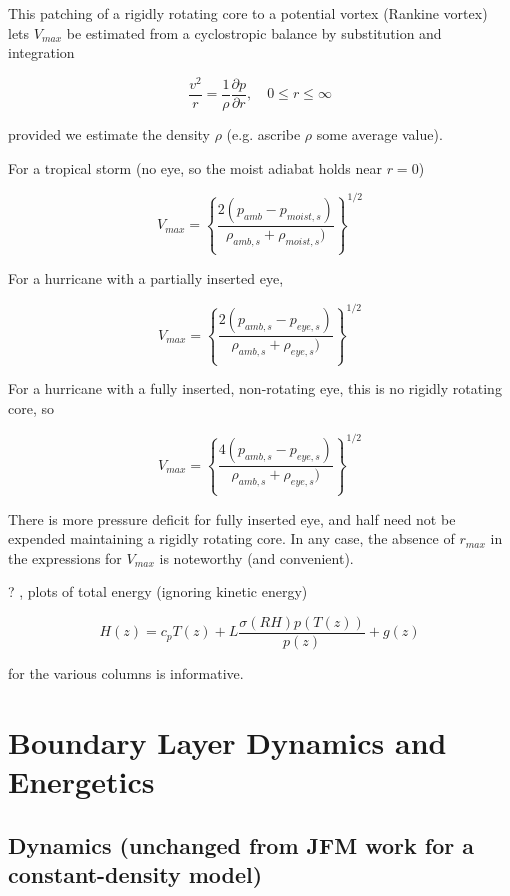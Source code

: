 \documentclass[preprint, prX]{revtex4}
\newcommand{\cbfrac}[2]{\left\{\frac{#1}{#2}\right\}}
\newcommand{\pd}[2]{\frac{\partial#1}{\partial#2}}
\begin{document}
This patching of a rigidly rotating core to a potential vortex (Rankine vortex) lets $V_{max}$ be estimated from a cyclostropic balance by substitution and integration

\begin{equation}
	\frac{v^2}{r} = \frac{1}{\rho} \pd{p}{r}, \quad 0 \le r \le \infty
\end{equation}

provided we estimate the density $\rho$ (e.g. ascribe $\rho$ some average value).

For a tropical storm (no eye, so the moist adiabat holds near $r=0$)

\begin{equation}
	V_{max} = \cbfrac{ 2 ( p_{amb} - p_{moist,s})}{ \rho_{amb,s} + \rho_{moist,s}) }^{1/2}
\end{equation}

For a hurricane with a partially inserted eye,

\begin{equation}
	V_{max} = \cbfrac{ 2 ( p_{amb,s} - p_{eye,s})}{ \rho_{amb,s} + \rho_{eye,s}) }^{1/2}
\end{equation}

For a hurricane with a fully inserted, non-rotating eye, this is no rigidly rotating core, so

\begin{equation}
	V_{max} = \cbfrac{ 4 ( p_{amb,s} - p_{eye,s})}{ \rho_{amb,s} + \rho_{eye,s}) }^{1/2}
\end{equation}

There is more pressure deficit for fully inserted eye, and half need not be expended maintaining a rigidly rotating core. In any case, the absence of $r_{max}$ in the expressions for $V_{max}$ is noteworthy (and convenient).

? , plots of total energy (ignoring kinetic energy)

\begin{equation}
	H(z) = c_p T(z) + L \frac{\sigma(RH) p(T(z))}{p(z)} + g(z)
\end{equation}

for the various columns is informative.

\section{Boundary Layer Dynamics and Energetics}

\subsection{Dynamics (unchanged from JFM work for a constant-density model)}
\end{document}
